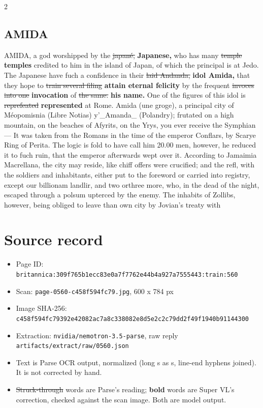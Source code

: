 \documentclass[10pt]{article}
\begin{document}
\begin{multicols}{2}
\subsection*{AMIDA}
AMIDA, a god worshipped by the \sout{japané,} \textbf{Japanese,} who has many \sout{temple} \textbf{temples} credited to him in the island of Japan, of which the principal is at Jedo. The Japanese have fuch a confidence in their \sout{laid Andanda,} \textbf{idol Amida,} that they hope to \sout{train several filing} \textbf{attain eternal felicity} by the frequent \sout{invoces into one} \textbf{invocation} of \sout{the same.} \textbf{his name.} One of the figures of this idol is \sout{reprefeated} \textbf{represented} at Rome. Amida (une groge), a principal city of Méopomisnia (Libre Notias) y'\_Amanda\_ (Polandry); frutated on a high mountain, on the beaches of Afyrits, on the Yrys, you ever receive the Symphian— It was taken from the Romans in the time of the emperor Conflars, by Scarye Ring of Perita. The logic is fold to have call him 20.00 men, however, he reduced it to fuch ruin, that the emperor afterwards wept over it. According to Jamaimia Macrellana, the city may reside, like chiff offers were crucified; and the refl, with the soldiers and inhabitants, either put to the foreword or carried into registry, except our billionam landlir, and two orthree more, who, in the dead of the night, escaped through a polsum upterced by the enemy. The inhabits of Zollibs, however, being obliged to leave than own city by Jovian’s treaty with
\end{multicols}
\section*{Source record}
\begin{itemize}
\item Page ID: \texttt{britannica:309f765b1ecc83e0a7f7762e44b4a927a7555443:train:560}
\item Scan: \texttt{page-0560-c458f594fc79.jpg}, 600 x 784 px
\item Image SHA-256: \texttt{\small c458f594fc79392e42082ac7a8c338082e8d5e2c2c79dd2f49f1940b91144300}
\item Extraction: \texttt{nvidia/nemotron-3.5-parse}, raw reply \texttt{artifacts/extract/raw/0560.json}
\item Text is Parse OCR output, normalized (long s as s, line-end hyphens joined). It is not corrected by hand.
\item \sout{Struck-through} words are Parse's reading; \textbf{bold} words are Super VL's correction, checked against the scan image. Both are model output.
\end{itemize}
\end{document}
